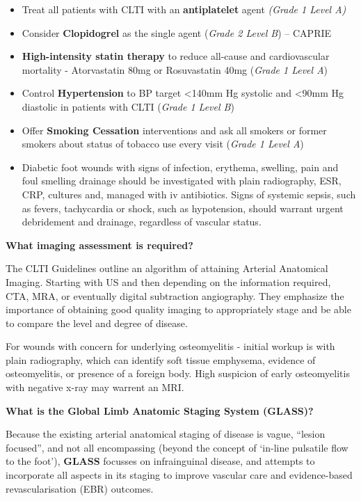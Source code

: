 \documentclass[
]{book}
\begin{document}
\begin{itemize}
\item
  Treat all patients with CLTI with an \textbf{antiplatelet} agent \emph{(Grade 1
  Level A)}
\item
  Consider \textbf{Clopidogrel} as the single agent (\emph{Grade 2 Level B}) --
  CAPRIE\citep{capriesteeringcommittee1996}
\item
  \textbf{High-intensity statin therapy} to reduce all-cause and cardiovascular
  mortality - Atorvastatin 80mg or Rosuvastatin 40mg (\emph{Grade 1 Level
  A}) \citep{arya2018, 2013acc}
\item
  Control \textbf{Hypertension} to BP target \textless140mm Hg systolic and \textless90mm Hg
  diastolic in patients with CLTI (\emph{Grade 1 Level B})
\item
  Offer \textbf{Smoking Cessation} interventions and ask all smokers or former
  smokers about status of tobacco use every visit (\emph{Grade 1 Level
  A})
\item
  Diabetic foot wounds with signs of infection, erythema, swelling,
  pain and foul smelling drainage should be investigated with plain
  radiography, ESR, CRP, cultures and, managed with iv antibiotics.
  Signs of systemic sepsis, such as fevers, tachycardia or shock, such
  as hypotension, should warrant urgent debridement and drainage, regardless
  of vascular status.
\end{itemize}

\textbf{What imaging assessment is required?}

The CLTI Guidelines outline an algorithm of attaining Arterial Anatomical
Imaging. Starting with US and then depending on the information
required, CTA, MRA, or eventually digital subtraction angiography. They
emphasize the importance of obtaining good quality imaging to
appropriately stage and be able to compare the level and degree of
disease.

For wounds with concern for underlying osteomyelitis - initial workup is
with plain radiography, which can identify soft tissue emphysema,
evidence of osteomyelitis, or presence of a foreign body. High suspicion
of early osteomyelitis with negative x-ray may warrent an MRI.\citep{giurato2017}

\textbf{What is the Global Limb Anatomic Staging System (GLASS)?}
\citep{conteGlobalVascularGuidelines2019a}

Because the existing arterial anatomical staging of disease is
vague, ``lesion focused'', and not all encompassing (beyond the
concept of `in-line pulsatile flow to the foot'), \textbf{GLASS} focusses on
infrainguinal disease, and attempts to incorporate all aspects in its
staging to improve vascular care and evidence-based revascularisation (EBR)
outcomes.~
\end{document}
